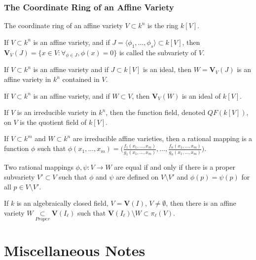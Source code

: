 \documentclass[crop=false,class=book,oneside]{standalone}
\begin{document}
\subsubsection{The Coordinate Ring of an Affine Variety}
\begin{definition}
The coordinate ring of an affine variety $V\subset k^n$ is the ring $k[V]$.
\end{definition}
\begin{definition}
If $V\subset k^n$ is an affine variety, and if $J = \langle \phi_1,\hdots, \phi_s\rangle \subset k[V]$, then $\mathbf{V}_{V}(J) = \{x\in V:\forall_{\phi \in J}, \phi(x) = 0 \}$ is called the subvariety of $V$.
\end{definition}
\begin{theorem}
If $V\subset k^n$ is an affine variety and if $J\subset k[V]$ is an ideal, then $W = \mathbf{V}_{V}(J)$ is an affine variety in $k^n$ contained in $V$.
\end{theorem}
\begin{theorem}
If $V\subset k^n$ is an affine variety, and if $W\subset V$, then $\mathbf{V}_{V}(W)$ is an ideal of $k[V]$.
\end{theorem}
\begin{definition}
If $V$ is an irreducible variety in $k^n$, then the function field, denoted $QF(k[V])$, on $V$ is the quotient field of $k[V]$.
\end{definition}
\begin{definition}
If $V\subset k^m$ and $W\subset k^n$ are irreducible affine varieties, then a rational mapping is a function $\phi$ such that $\phi(x_1,\hdots, x_m) = \bigg(\frac{f_1(x_1,\hdots, x_m)}{g_1(x_1,\hdots, x_m)}, \hdots, \frac{f_n(x_1,\hdots, x_m)}{g_n(x_1,\hdots, x_m)}\bigg)$.
\end{definition}
\begin{theorem}
Two rational mappings $\phi,\psi:V\rightarrow W$ are equal if and only if there is a proper subvariety $V'\subset V$ such that $\phi$ and $\psi$ are defined on $V\setminus V'$ and $\phi(p) = \psi(p)$ for all $p \in V\setminus V'$.
\end{theorem}
\begin{theorem}
If $k$ is an algebraically closed field, $V=\mathbf{V}(I)$, $V\ne \emptyset$, then there is an affine variety $W\underset{Proper}\subset \mathbf{V}(I_{\ell})$ such that $\mathbf{V}(I_{\ell})\setminus W \subset \pi_{\ell}(V)$.
\end{theorem}
\section{Miscellaneous Notes}
\end{document}

